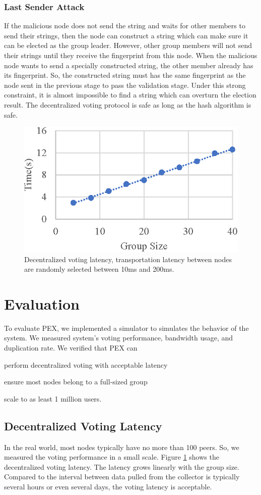 \documentclass[twocolumn]{article}
\begin{document}
\subsubsection{Last Sender Attack}
If the malicious node does not send the string and waits for other members to send their strings, then the node can construct a string which can make sure it can be elected as the group leader. However, other group members will not send their strings until they receive the fingerprint from this node. When the malicious node wants to send a specially constructed string, the other member already has its fingerprint. So, the constructed string must has the same fingerprint as the node sent in the previous stage to pass the validation stage. Under this strong constraint, it is almost impossible to find a string which can overturn the election result. The decentralized voting protocol is safe as long as the hash algorithm is safe.

\begin{figure}[h]
\centering
\includegraphics[width=.45\textwidth]{fig/latency.eps}
\caption{Decentralized voting latency, transportation latency between nodes are randomly selected between 10ms and 200ms.}
\label{fig:latency}
\end{figure}

\section{Evaluation}
To evaluate PEX, we implemented a simulator to simulates the behavior of the system. We measured system's voting performance, bandwidth usage, and duplication rate. We verified that PEX can 
\begin{enumerate*}[label=(\roman*)]
    \item perform decentralized voting with acceptable latency
    \item ensure most nodes belong to a full-sized group
    \item scale to as least 1 million users.
\end{enumerate*}

\subsection{Decentralized Voting Latency}
In the real world, most nodes typically have no more than 100 peers. So, we measured the voting performance in a small scale. Figure \ref{fig:latency} shows the decentralized voting latency. The latency grows linearly with the group size. Compared to the interval between data pulled from the collector is typically several hours or even several days, the voting latency is acceptable.
\end{document}

